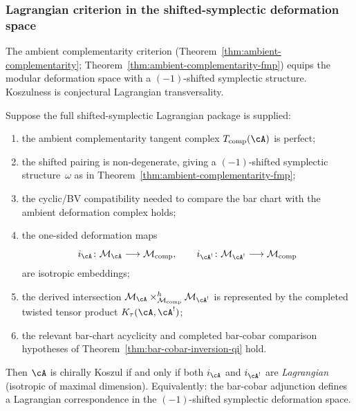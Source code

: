 \medskip
\medskip

\subsubsection{Lagrangian criterion in the shifted-symplectic deformation space}

The ambient complementarity criterion
(Theorem~\ref{thm:ambient-complementarity};
Theorem~\ref{thm:ambient-complementarity-fmp}) equips the modular
deformation space with a $(-1)$-shifted symplectic structure.
Koszulness is conjectural Lagrangian transversality.

\begin{conjecture}%
\label{conj:lagrangian-koszulness}%
Suppose the full shifted-symplectic Lagrangian package is supplied:
\begin{enumerate}[label=\textup{(L\arabic*)}]
\item the ambient complementarity tangent complex
 \(T_{\mathrm{comp}}(\cA)\) is perfect;
\item the shifted pairing is non-degenerate, giving a
 \((-1)\)-shifted symplectic structure~\(\omega\) as in
 Theorem~\textup{\ref{thm:ambient-complementarity-fmp}};
\item the cyclic/BV compatibility needed to compare the bar chart with
 the ambient deformation complex holds;
\item the one-sided deformation maps
\[
 i_{\cA} \colon \mathcal{M}_{\cA} \longrightarrow \mathcal{M}_{\mathrm{comp}},
 \qquad
 i_{\cA^!} \colon \mathcal{M}_{\cA^!} \longrightarrow \mathcal{M}_{\mathrm{comp}}
\]
are isotropic embeddings;
\item the derived intersection
\(\mathcal{M}_\cA\times^h_{\mathcal{M}_{\mathrm{comp}}}
\mathcal{M}_{\cA^!}\) is represented by the completed twisted tensor
product \(K_\tau(\cA,\cA^!)\);
\item the relevant bar-chart acyclicity and completed bar-cobar
comparison hypotheses of Theorem~\textup{\ref{thm:bar-cobar-inversion-qi}}
hold.
\end{enumerate}
Then $\cA$ is chirally Koszul if and only if both
$i_{\cA}$ and $i_{\cA^!}$ are \emph{Lagrangian} \textup{(}isotropic of maximal
dimension\textup{)}. Equivalently: the bar-cobar adjunction defines a Lagrangian
correspondence in the $(-1)$-shifted symplectic deformation space.
\end{conjecture}

